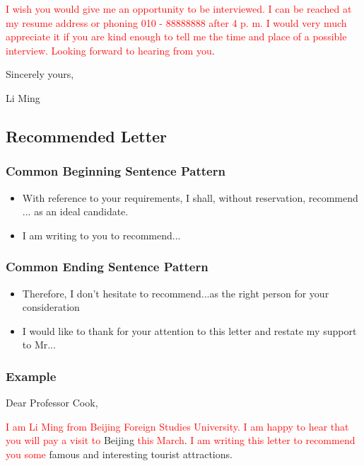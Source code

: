 \documentclass{article}
\begin{document}
\par \textcolor{red}{I wish you would give me an opportunity to be interviewed. I can be reached at my resume address or phoning 010 - 88888888 after 4 p. m. I would very much appreciate it if you are kind enough to tell me the time and place of a possible interview. Looking forward to hearing from you}.

\hfill Sincerely yours,

\hfill Li Ming


\subsection{Recommended Letter}
\label{sec:letter}

\subsubsection{Common Beginning Sentence Pattern}
\label{sec:comm-begnn-sent}
\begin{itemize}
\item With reference to your requirements, I shall, without reservation, recommend ... as
  an ideal candidate.
\item I am writing to you to recommend...  
\end{itemize}

\subsubsection{Common Ending Sentence Pattern}
\label{sec:comm-ending-sent-2}
\begin{itemize}
\item Therefore, I don't hesitate to recommend...as the right person for your
  consideration
\item I would like to thank for your attention to this letter and restate my support to Mr...
\end{itemize}

\subsubsection{Example}
\label{sec:example-2}
Dear Professor Cook,
\par \textcolor{red}{I am Li Ming from Beijing Foreign Studies University. I am happy to
  hear that you will pay a visit to} Beijing \textcolor{red}{this March}. \textcolor{red}{I am
  writing this letter to recommend you some} famous and interesting tourist attractions.
\end{document}
